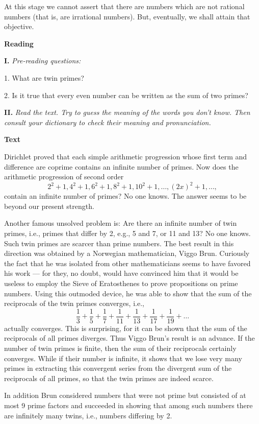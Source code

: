 \documentclass[a4paper]{article}
\newcounter{EUnits}
\newcommand{\EUnit}{\par\medskip{\huge \textbf{Unit \arabic{EUnits}}}\par\stepcounter{EUnits}}
\newcommand{\ESect}[1]{\medskip\par{\large \textbf{#1}}\par}
\newcommand{\ETask}[2]{\medskip\par\textbf{#1.} \textit{#2}\par}
\begin{document}
At this stage we cannot assert that there are numbers which are not rational numbers (that is, are irrational numbers). But,
eventually, we shall attain that objective.

\EUnit
\ESect{Reading}
\ETask{I}{Pre-reading questions:}

1. What are twin primes?

2. Is it true that every even number can be written as the sum of two primes?

\ETask{II}{Read the text. Try to guess the meaning of the words you don't know. Then consult your dictionary to check their
meaning and pronunciation.}

\ESect{Text}
Dirichlet proved that each simple arithmetic progression whose first term and difference are coprime contains an infinite
number of primes. Now does the arithmetic progression of second order
$$2^2+1,4^2+1,6^2+1,8^2+1,10^2+1, \ldots, (2x)^2+1, \ldots,$$
contain an infinite number of primes? No one knows. The answer seems to be beyond our present strength.

Another famous unsolved problem is: Are there an infinite number of twin primes, i.e., primes that differ by 2, e.g., 5 and 7,
or 11 and 13? No one knows. Such twin primes are scarcer than prime numbers. The best result in this direction was obtained by
a Norwegian mathematician, Viggo Brun. Curiously the fact that he was isolated from other mathematicians seems to have favored
his work --- for they, no doubt, would have convinced him that it would be useless to employ the Sieve of Eratosthenes to prove
propositions on prime numbers. Using this outmoded device, he was able to show that the sum of the reciprocals of the twin
primes converges, i.e.,
$$\frac{1}{3}+\frac{1}{5}+\frac{1}{7}+\frac{1}{11}+\frac{1}{13}+\frac{1}{17}+\frac{1}{19}+\ldots$$
actually converges. This is surprising, for it can be shown that the sum of the reciprocals of all primes diverges. Thus Viggo
Brun's result is an advance. If the number of twin primes is finite, then the sum of their reciprocals certainly converges.
While if their number is infinite, it shows that we lose very many primes in extracting this convergent series from the divergent
sum of the reciprocals of all primes, so that the twin primes are indeed scarce.

In addition Brun considered numbers that were not prime but consisted of at most 9 prime factors and succeeded in showing that
among such numbers there are infinitely many twins, i.e., numbers differing by 2.
\end{document}
